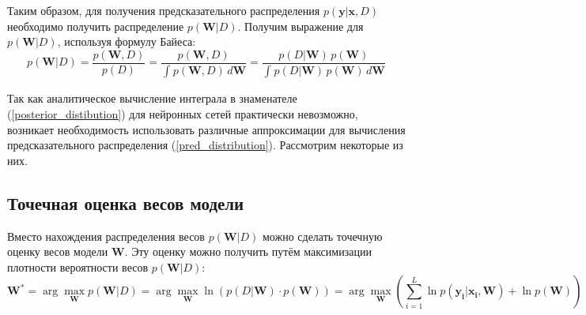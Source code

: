 \documentclass{article}
\newcommand{\argmax}{\arg\!\max}
\numberwithin{equation}{section}
\begin{document}
    Таким образом, для получения предсказательного распределения $p(\pmb{y} | \pmb{x}, D)$
    необходимо получить распределение $p(\pmb{W}| D)$.
    Получим выражение для $p(\pmb{W}| D)$, используя формулу Байеса:
    \begin{equation}\label{posterior_distibution}
        p(\pmb{W}| D)
        =
        \frac
            {p(\pmb{W}, D)}
            {p(D)}
        =
        \frac
            {p(\pmb{W}, D)}
            {
                \int_{}{
                    p(\pmb{W}, D)
                    \,
                    d\pmb{W}
                }
            }
        =
        \frac
            {
                p(D | \pmb{W})
                \,
                p(\pmb{W})
            }
            {
                \int_{}{
                    p(D | \pmb{W})
                    \,
                    p(\pmb{W})
                    \,
                    d\pmb{W}
                }
            }
    \end{equation}

    Так как аналитическое вычисление интеграла в знаменателе (\ref{posterior_distibution})
    для нейронных сетей практически невозможно, возникает необходимость использовать различные аппроксимации
    для вычисления предсказательного распределения (\ref{pred_distribution}). Рассмотрим некоторые из них.

    \subsection{Точечная оценка весов модели}
    Вместо нахождения распределения весов $p(\pmb{W}| D)$
    можно сделать точечную оценку весов модели $\pmb{W}$.
    Эту оценку можно получить путём максимизации плотности вероятности весов $p(\pmb{W}| D)$:
    \begin{equation}\label{max_posterior}
        \pmb{W}^*
        =
        \argmax_{\pmb{W}}{
            p(\pmb{W} | D)
        }
        =
        \argmax_{\pmb{W}}{
            \ln{
                (
                    p(D | \pmb{W})
                    \cdot
                    p(\pmb{W})
                )
            }
        }
        =
        \argmax_{\pmb{W}} {
            (
                \sum_{i=1}^{L}{
                    \ln{
                        p(\pmb{y_{i}} | \pmb{x_{i}}, \pmb{W})
                    }
                }
                +
                \ln{p(\pmb{W})}
            )
        }
    \end{equation}
\end{document}

